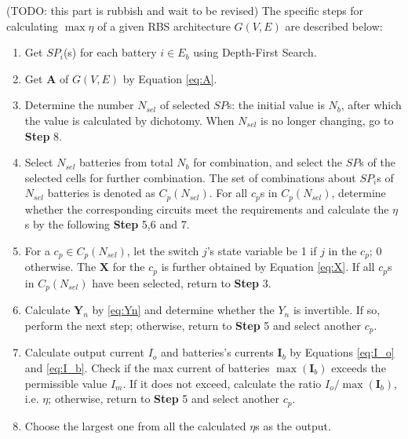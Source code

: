 \documentclass{article}
\begin{document}
(TODO: this part is rubbish and wait to be revised)
The specific steps for calculating $\max \eta$ of a given RBS architecture $G(V,E)$ are described below:
\begin{enumerate}
    \item Get $SP_i$(s) for each battery $i\in E_b$ using Depth-First Search.
    \item Get $\bm{A}$ of $G(V,E)$ by Equation \ref{eq:A}.
    \item Determine the number $N_{sel}$ of selected $SP$s: the initial value is $N_b$, after which the value is calculated by dichotomy.
    When $N_{sel}$ is no longer changing, go to \textbf{Step }8.
    \item Select $N_{sel}$ batteries from total $N_b$ for combination, and select the $SP$s of the selected cells for further combination. 
    The set of combinations about $SP_i$s of $N_{sel}$ batteries is denoted as $C_p(N_{sel})$. 
    For all $c_p$s in $C_p(N_{sel})$, determine whether the corresponding circuits meet the requirements and calculate the $\eta$s by the following \textbf{Step }5,6 and 7.
    \item For a $c_p\in C_p(N_{sel})$, let the switch $j$'s state variable be 1 if $j$ in the $c_p$; 0 otherwise. The $\bm{X}$ for the $c_p$ is further obtained by Equation \ref{eq:X}.
    If all $c_p$s in $C_p(N_{sel})$ have been selected, return to \textbf{Step }3.
    \item Calculate $\bm{Y}_n$ by \ref{eq:Yn} and determine whether the $Y_n$ is invertible.
    If so, perform the next step; otherwise, return to \textbf{Step }5 and select another $c_p$.
    \item Calculate output current $I_o$ and batteries's currents $\bm{I}_b$ by Equations \ref{eq:I_o} and \ref{eq:I_b}.
    Check if the max current of batteries $\max(\bm{I}_b)$ exceeds the permissible value $I_m$.
    If it does not exceed, calculate the ratio $I_o/\max(\bm{I}_b)$, i.e. $\eta$; otherwise, return to \textbf{Step }5 and select another $c_p$.
    \item Choose the largest one from all the calculated $\eta$s as the output.
\end{enumerate}
\end{document}

